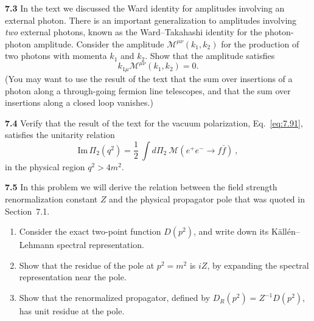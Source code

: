 \textbf{7.3} In the text we discussed the Ward identity for amplitudes
involving an external photon.  There is an important generalization to
amplitudes involving \emph{two} external photons, known as the
Ward--Takahashi identity for the photon-photon amplitude.  Consider the
amplitude $\mathcal{M}^{\mu\nu}(k_1, k_2)$ for the production of two photons
with momenta $k_1$ and $k_2$.  Show that the amplitude satisfies
\begin{equation}
  k_{1\mu}\mathcal{M}^{\mu\nu}(k_1, k_2) = 0 .
\end{equation}
(You may want to use the result of the text that the sum over insertions of a
photon along a through-going fermion line telescopes, and that the sum over
insertions along a closed loop vanishes.)

\textbf{7.4} Verify that the result of the text for the vacuum polarization,
Eq.~\eqref{eq:7.91}, satisfies the unitarity relation
\begin{equation}
  \mathrm{Im}\,\Pi_2(q^2) = \frac{1}{2}\ \int d\Pi_2\
    \mathcal{M}(e^{+}e^{-}\to f\bar{f})\ ,
\end{equation}
in the physical region $q^2 > 4m^2$.

\textbf{7.5} In this problem we will derive the relation between the field
strength renormalization constant $Z$ and the physical propagator pole that
was quoted in Section~7.1.
\begin{enumerate}[label=(\alph*)]
  \item Consider the exact two-point function $D(p^2)$, and write down its
    K\"all\'en--Lehmann spectral representation.
  \item Show that the residue of the pole at $p^2 = m^2$ is $iZ$, by
    expanding the spectral representation near the pole.
  \item Show that the renormalized propagator, defined by $D_R(p^2) =
    Z^{-1}D(p^2)$, has unit residue at the pole.
\end{enumerate}

